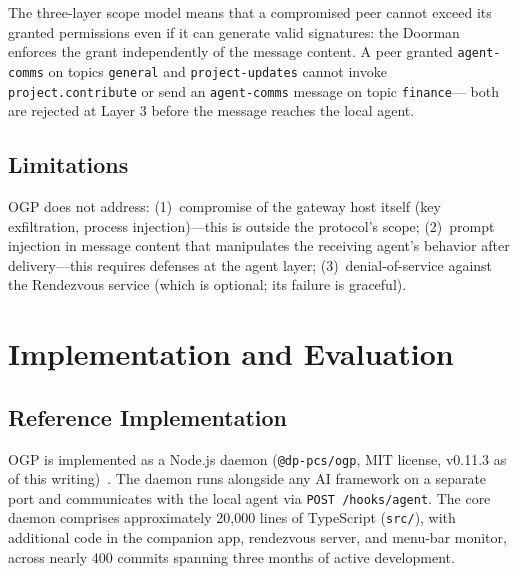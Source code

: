 \documentclass[sigconf,nonacm]{acmart}
\begin{document}
The three-layer scope model means that a compromised peer cannot exceed
its granted permissions even if it can generate valid signatures:
the Doorman enforces the grant independently of the message content.
A peer granted \texttt{agent-comms} on topics \texttt{general} and
\texttt{project-updates} cannot invoke \texttt{project.contribute}
or send an \texttt{agent-comms} message on topic \texttt{finance}---
both are rejected at Layer 3 before the message reaches the local agent.

\subsection{Limitations}

OGP does not address:
(1)~compromise of the gateway host itself (key exfiltration, process
injection)---this is outside the protocol's scope;
(2)~prompt injection in message content that manipulates the receiving
agent's behavior after delivery---this requires defenses at the agent layer;
(3)~denial-of-service against the Rendezvous service (which is optional;
its failure is graceful).

\section{Implementation and Evaluation}

\subsection{Reference Implementation}

OGP is implemented as a Node.js daemon (\texttt{@dp-pcs/ogp}, MIT license,
v0.11.3 as of this writing)~\cite{ogp2025}. The daemon runs alongside any AI
framework on a separate port and communicates with the local agent via
\texttt{POST /hooks/agent}.
The core daemon comprises approximately 20{,}000 lines of TypeScript
(\texttt{src/}), with additional code in the companion app, rendezvous
server, and menu-bar monitor, across nearly 400 commits spanning three
months of active development.
\end{document}

